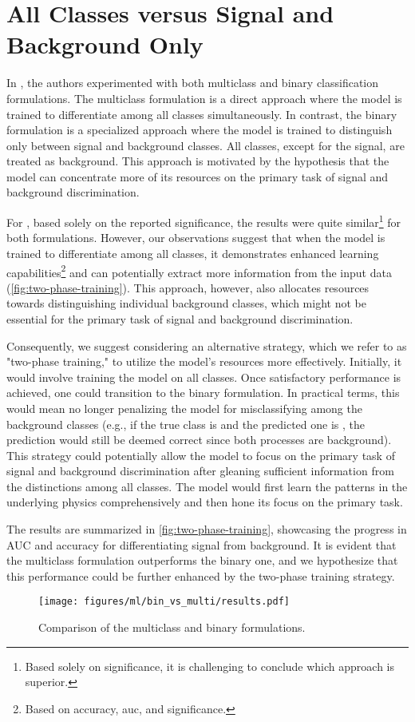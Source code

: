 \section{All Classes versus Signal and Background Only}
\label{sec:binary}

In \cite{severin}, the authors experimented with both multiclass and binary classification formulations. The multiclass
formulation is a direct approach where the model is trained to differentiate among all classes simultaneously. In
contrast, the binary formulation is a specialized approach where the model is trained to distinguish only between signal
and background classes. All classes, except for the signal, are treated as background. This approach is motivated by the
hypothesis that the model can concentrate more of its resources on the primary task of signal and background
discrimination.

For \cite{severin}, based solely on the reported significance, the results were quite similar\footnote{Based solely on
    significance, it is challenging to conclude which approach is superior.} for both formulations. However, our
observations suggest that when the model is trained to differentiate among all classes, it demonstrates enhanced
learning capabilities\footnote{Based on accuracy, \gls{auc}, and significance.} and can potentially extract more
information from the input data (\autoref{fig:two-phase-training}). This approach, however, also allocates resources
towards distinguishing individual background classes, which might not be essential for the primary task of signal and
background discrimination.

Consequently, we suggest considering an alternative strategy, which we refer to as "two-phase training," to utilize the
model's resources more effectively. Initially, it would involve training the model on all classes. Once satisfactory
performance is achieved, one could transition to the binary formulation. In practical terms, this would mean no longer
penalizing the model for misclassifying among the background classes (e.g., if the true class is \ttw and the predicted
one is \ttz, the prediction would still be deemed correct since both processes are background). This strategy could
potentially allow the model to focus on the primary task of signal and background discrimination after gleaning
sufficient information from the distinctions among all classes. The model would first learn the patterns in the
underlying physics comprehensively and then hone its focus on the primary task.

The results are summarized in \autoref{fig:two-phase-training}, showcasing the progress in AUC and accuracy for
differentiating signal from background. It is evident that the multiclass formulation outperforms the binary one, and
we hypothesize that this performance could be further enhanced by the two-phase training strategy.


\begin{figure}[htb]
    \centering
    \texttt{[image: figures/ml/bin\_vs\_multi/results.pdf]}
    \caption{Comparison of the multiclass and binary formulations. \transplot}
    \label{fig:two-phase-training}
\end{figure}